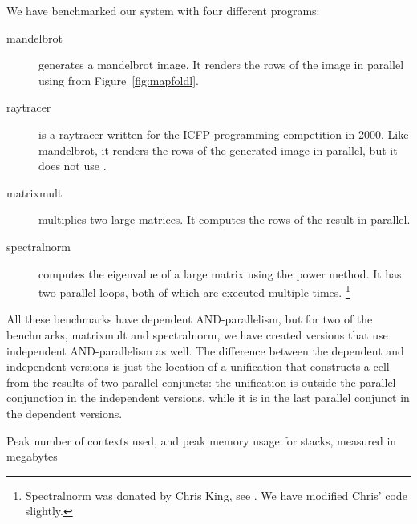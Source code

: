 We have benchmarked our system with four different programs:
\begin{description}
\item[mandelbrot]
generates a mandelbrot image.
It renders the rows of the image in parallel
using \mapfoldl{} from Figure~\ref{fig:mapfoldl}.
\item[raytracer]
is a raytracer written for
the ICFP programming competition in 2000.
Like mandelbrot, it renders the rows of the generated image in parallel,
but it does not use \mapfoldl{}.
\item[matrixmult]
multiplies two large matrices.
It computes the rows of the result in parallel.
\item[spectralnorm]
computes the eigenvalue of a large matrix using the power method.
It has two parallel loops, both of which are executed multiple times.
\footnote{
Spectralnorm was donated by Chris King, see
.
We have modified Chris' code slightly.}
\end{description}

\noindent
All these benchmarks have dependent AND-parallelism,
but for two of the benchmarks, matrixmult and spectralnorm,
we have created versions that use independent AND-parallelism as well.
The difference between the dependent and independent versions
is just the location of a unification that constructs a cell
from the results of two parallel conjuncts:
the unification is outside the parallel conjunction in the independent versions,
while it is in the last parallel conjunct in the dependent versions.


\begin{sidewaystable}[tbp]
\begin{center}

\caption[Peak number of contexts used,
and peak memory usage for stacks]{Peak number of contexts used,
and peak memory usage for stacks, measured in megabytes}
\label{tab:lc_mem}
\end{center}
\end{sidewaystable}

